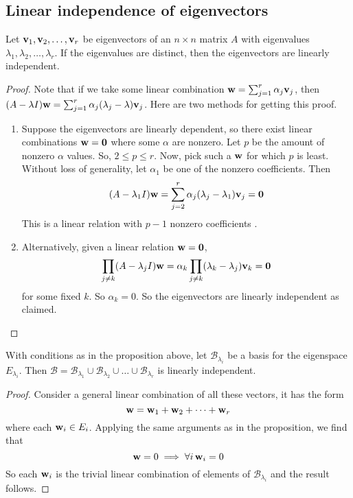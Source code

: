 \subsection{Linear independence of eigenvectors}
\begin{proposition}
	Let \(\vb v_1, \vb v_2, \dots, \vb v_r\) be eigenvectors of an \(n\times n\) matrix \(A\) with eigenvalues \(\lambda_1, \lambda_2,\dots,\lambda_r\).
	If the eigenvalues are distinct, then the eigenvectors are linearly independent.
\end{proposition}
\begin{proof}
	Note that if we take some linear combination \(\vb w = \sum_{j=1}^r \alpha_j\vb v_j\), then \((A - \lambda I)\vb w = \sum_{j=1}^r \alpha_j(\lambda_j - \lambda)\vb v_j\).
	Here are two methods for getting this proof.
	\begin{enumerate}
		\item Suppose the eigenvectors are linearly dependent, so there exist linear combinations \(\vb w = \vb 0\) where some \(\alpha\) are nonzero.
		      Let \(p\) be the amount of nonzero \(\alpha\) values.
		      So, \(2 \leq p \leq r\).
		      Now, pick such a \(\vb w\) for which \(p\) is least.
		      Without loss of generality, let \(\alpha_1\) be one of the nonzero coefficients.
		      Then
		      \[
			      (A - \lambda_1 I)\vb w = \sum_{j=2}^r \alpha_j(\lambda_j - \lambda_1)\vb v_j = \vb 0
		      \]
		      This is a linear relation with \(p-1\) nonzero coefficients \contradiction.
		\item Alternatively, given a linear relation \(\vb w=\vb 0\),
		      \[
			      \prod_{j \neq k} (A - \lambda_j I) \vb w = \alpha_k \prod_{j \neq k} (\lambda_k - \lambda_j) \vb v_k = \vb 0
		      \]
		      for some fixed \(k\).
		      So \(\alpha_k = 0\).
		      So the eigenvectors are linearly independent as claimed.
	\end{enumerate}
\end{proof}
\begin{corollary}
	With conditions as in the proposition above, let \(\mathcal B_{\lambda_i}\) be a basis for the eigenspace \(E_{\lambda_i}\).
	Then \(\mathcal B = \mathcal B_{\lambda_1} \cup \mathcal B_{\lambda_2} \cup \dots \cup \mathcal B_{\lambda_r}\) is linearly independent.
\end{corollary}
\begin{proof}
	Consider a general linear combination of all these vectors, it has the form
	\[
		\vb w = \vb w_1 + \vb w_2 + \dots + \vb w_r
	\]
	where each \(\vb w_i \in E_i\).
	Applying the same arguments as in the proposition, we find that
	\[
		\vb w = 0 \implies \forall i\,\vb w_i = 0
	\]
	So each \(\vb w_i\) is the trivial linear combination of elements of \(\mathcal B_{\lambda_i}\) and the result follows.
\end{proof}

